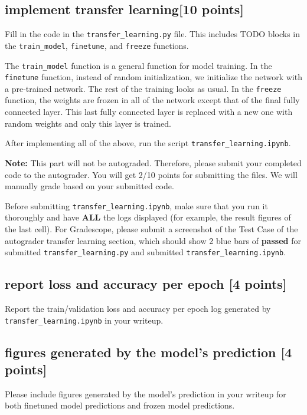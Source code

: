 \documentclass[lang=cn,11pt]{elegantbook}
\begin{document}
\subsection{implement transfer learning[10 points]}
Fill in the code in the \texttt{transfer\_learning.py} file. This includes TODO blocks in the \texttt{train\_model}, \texttt{finetune}, and \texttt{freeze} functions.

The \texttt{train\_model} function is a general function for model training. In the \texttt{finetune} function, instead of random initialization, we initialize the network with a pre-trained network. The rest of the training looks as usual. In the \texttt{freeze} function, the weights are frozen in all of the network except that of the final fully connected layer. This last fully connected layer is replaced with a new one with random weights and only this layer is trained.

After implementing all of the above, run the script \texttt{transfer\_learning.ipynb}.

\textbf{Note:} This part will not be autograded. Therefore, please submit your completed code to the autograder. You will get 2/10 points for submitting the files. We will manually grade based on your submitted code.

Before submitting \texttt{transfer\_learning.ipynb}, make sure that you run it thoroughly and have \textbf{ALL} the logs displayed (for example, the result figures of the last cell). For Gradescope, please submit a screenshot of the Test Case of the autograder transfer learning section, which should show 2 blue bars of \textbf{passed} for submitted \texttt{transfer\_learning.py} and submitted \texttt{transfer\_learning.ipynb}.


\subsection*{report loss and accuracy per epoch [4 points]}
Report the train/validation loss and accuracy per epoch log generated by \texttt{transfer\_learning.ipynb} in your writeup.




\subsection*{figures generated by the model’s prediction [4 points]}
Please include figures generated by the model’s prediction in your writeup for both finetuned model predictions and frozen model predictions.
\end{document}
